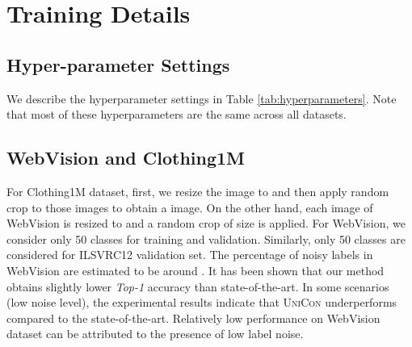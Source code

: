 \documentclass[10pt,twocolumn,letterpaper]{article}
\begin{document}
\section{Training Details} \label{sec:training_details}
\subsection{Hyper-parameter Settings}
We describe the hyperparameter settings in Table \ref{tab:hyperparameters}. Note that most of these hyperparameters are the same across all datasets. 

\subsection{WebVision and Clothing1M}
For Clothing1M dataset, first, we resize the image to  and then apply random crop to those images to obtain a  image. On the other hand, each image of WebVision is resized to  and a random crop of size  is applied. For WebVision, we consider only 50 classes for training and validation. Similarly, only 50 classes are considered for ILSVRC12 validation set. The percentage of noisy labels in WebVision are estimated to be around . It has been shown that our method obtains slightly lower \emph{Top-1} accuracy than state-of-the-art.  In some scenarios (low noise level), the experimental results indicate that \textsc{UniCon} underperforms compared to the state-of-the-art. Relatively low performance on WebVision dataset can be attributed to the presence of low label noise. 
























    


    
\end{document}

